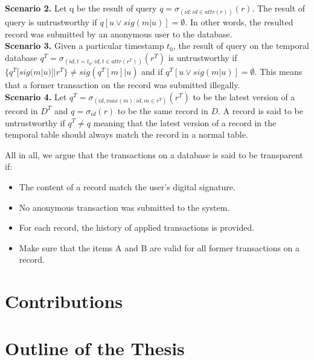 \textbf{Scenario 2.} Let q be the result of query $q=\sigma_{(id : id \in attr(r))}(r)$. The result of query is untrustworthy if $q[u \vee sig(m|u)] = \emptyset$. In other words, the resulted record was submitted by an anonymous user to the database.\\
\textbf{Scenario 3.} Given a particular timestamp $t_0$, the result of query on the temporal database  $q^T=\sigma_{(id,t=t_0 : id,t \in attr(r^T))}(r^T)$ is untrustworthy if $\{q^T[sig(m|u)]|r^T\} \neq sig(q^T[m]|u)$ and if $q^T[u \vee sig(m|u)] = \emptyset$. This means that a former transaction on the record was submitted illegally. \\
\textbf{Scenario 4.} Let $q^T = \sigma _{(id,max(m): id,m \in r^T)}(r^T)$ to be the latest version of a record in $D^T$ and $q=\sigma_{id}(r)$ to be the same record in $D$. A record is said to be untrustworthy if $q^T \neq q$ meaning that the latest version of a record in the temporal table should always match the record in a normal table.


All in all, we argue that the transactions on a database is said to be transparent if:
\begin{itemize}
	\item The content of a record match the user's digital signature.
	\item No anonymous transaction was submitted to the system.
	\item For each record, the history of applied transactions is provided. 
	\item Make sure that the items A and B are valid for all former transactions on a record.
\end{itemize}
\section{Contributions}
\section{Outline of the Thesis}
